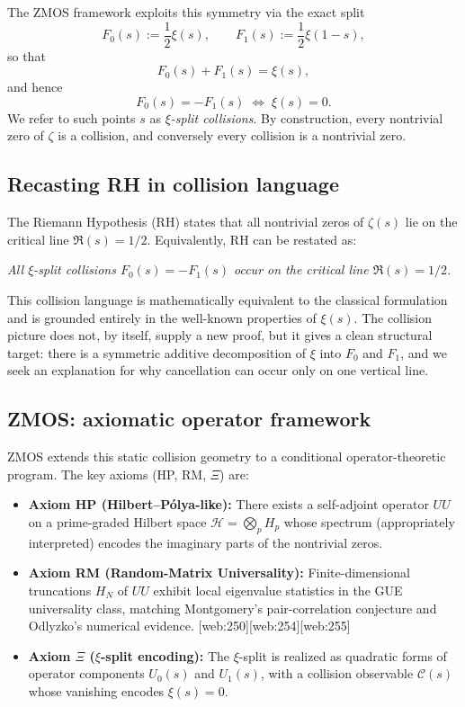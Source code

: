 \documentclass[11pt]{article}
\begin{document}
The ZMOS framework exploits this symmetry via the exact split
\begin{equation}
  F_0(s) := \frac12 \xi(s), \qquad
  F_1(s) := \frac12 \xi(1-s),
\end{equation}
so that
\begin{equation}
  F_0(s) + F_1(s) = \xi(s),
\end{equation}
and hence
\begin{equation}
  F_0(s) = -F_1(s) \;\Longleftrightarrow\; \xi(s)=0.
\end{equation}
We refer to such points $s$ as \emph{$\xi$-split collisions}.  By construction, every nontrivial zero of $\zeta$ is a collision, and conversely every collision is a nontrivial zero.

\subsection{Recasting RH in collision language}

The Riemann Hypothesis (RH) states that all nontrivial zeros of $\zeta(s)$ lie on the critical line $\Re(s)=1/2$.  Equivalently, RH can be restated as:

\medskip
\noindent
\emph{All $\xi$-split collisions $F_0(s)=-F_1(s)$ occur on the critical line $\Re(s)=1/2$.}

\medskip

This collision language is mathematically equivalent to the classical formulation and is grounded entirely in the well-known properties of $\xi(s)$.  The collision picture does not, by itself, supply a new proof, but it gives a clean structural target: there is a symmetric additive decomposition of $\xi$ into $F_0$ and $F_1$, and we seek an explanation for why cancellation can occur only on one vertical line.

\subsection{ZMOS: axiomatic operator framework}

ZMOS extends this static collision geometry to a conditional operator-theoretic program.  The key axioms (HP, RM, $\Xi$) are:

\begin{itemize}
  \item \textbf{Axiom HP (Hilbert--P\'olya-like):} There exists a self-adjoint operator $UU$ on a prime-graded Hilbert space $\mathcal{H} = \bigotimes_{p} H_p$ whose spectrum (appropriately interpreted) encodes the imaginary parts of the nontrivial zeros.
  \item \textbf{Axiom RM (Random-Matrix Universality):} Finite-dimensional truncations $H_N$ of $UU$ exhibit local eigenvalue statistics in the GUE universality class, matching Montgomery's pair-correlation conjecture and Odlyzko's numerical evidence. [web:250][web:254][web:255]
  \item \textbf{Axiom $\Xi$ ($\xi$-split encoding):} The $\xi$-split is realized as quadratic forms of operator components $U_0(s)$ and $U_1(s)$, with a collision observable $\mathcal{C}(s)$ whose vanishing encodes $\xi(s)=0$.
\end{itemize}
\end{document}
